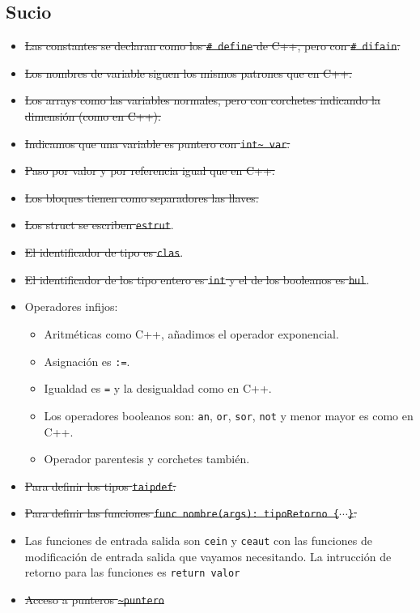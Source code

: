 \documentclass[10pt,a4paper]{article}
\begin{document}
\subsection{Sucio}
\begin{itemize}
    \item \sout{Las constantes se declaran como los \texttt{\# define} de C++, pero con \texttt{\# difain}.}
    \item \sout{Los nombres de variable siguen los mismos patrones que en C++.}
    \item \sout{Los arrays como las variables normales, pero con corchetes indicando la dimensión (como en C++).}
    \item \sout{Indicamos que una variable es puntero con \texttt{int\~{}  var}.}
    \item \sout{Paso por valor y por referencia igual que en C++.}
    \item \sout{Los bloques tienen como separadores las llaves.}
    \item \sout{Los struct se escriben \texttt{estrut}}.
    \item \sout{El identificador de tipo es \texttt{clas}}.
    \item \sout{El identificador de los tipo entero es \texttt{int} y el de los booleanos es \texttt{bul}}.
    \item Operadores infijos:
    \begin{itemize}
        \item Aritméticas como C++, añadimos el operador exponencial.
        \item Asignación es \texttt{:=}.
        \item Igualdad es \texttt{=} y la desigualdad como en C++.
        \item Los operadores booleanos son: \texttt{an}, \texttt{or}, \texttt{sor}, \texttt{not} y menor mayor es como en C++.
        \item Operador parentesis y corchetes también.
    \end{itemize}
    \item \sout{Para definir los tipos \texttt{taipdef}.}
    \item \sout{Para definir las funciones \texttt{func nombre(args): tipoRetorno \{$\cdots$\}}.}
    \item Las funciones de entrada salida son \texttt{cein} y \texttt{ceaut} con las funciones de modificación de entrada salida que vayamos necesitando. La intrucción de retorno para las funciones es \texttt{return valor}
    \item \sout{Acceso a punteros \texttt{\~{}puntero}}

\end{itemize}
\end{document}
